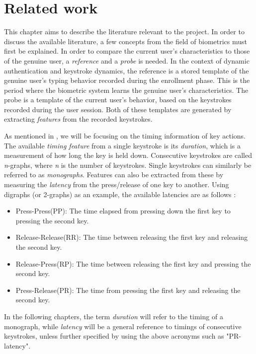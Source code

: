 \chapter{Related work}
\label{chap:related}
This chapter aims to describe the literature relevant to the project.
In order to discuss the available literature, a few concepts from the field of biometrics must first be explained.
In order to compare the current user's characteristics to those of the genuine user, a \textit{reference} and a \textit{probe} is needed.
In the context of dynamic authentication and keystroke dynamics, the reference is a stored template of the genuine user's typing behavior recorded during the enrollment phase. 
This is the period where the biometric system learns the genuine user's characteristics.
The probe is a template of the current user's behavior, based on the keystrokes recorded during the user session.
Both of these templates are generated by extracting \textit{features} from the recorded keystrokes.

As mentioned in , we will be focusing on the timing information of key actions.
The available \textit{timing feature} from a single keystroke is its \textit{duration}, which is a measurement of how long the key is held down.
Consecutive keystrokes are called \textit{n}-graphs, where \textit{n} is the number of keystrokes.
Single keystrokes can similarly be referred to as \textit{monographs}.
Features can also be extracted from these by measuring the \textit{latency} from the press/release of one key to another.
Using digraphs (or 2-graphs) as an example, the available latencies are as follows \cite{mondal}:
\begin{itemize}
    \item Press-Press(PP): The time elapsed from pressing down the first key to pressing the second key.
    \item Release-Release(RR): The time between releasing the first key and releasing the second key.
    \item Release-Press(RP): The time between releasing the first key and pressing the second key.
    \item Press-Release(PR): The time from pressing the first key and releasing the second key.
\end{itemize}
In the following chapters, the term \textit{duration} will refer to the timing of a monograph, while \textit{latency} will be a general reference to timings of consecutive keystrokes, unless further specified by using the above acronyms such as "PR-latency".

